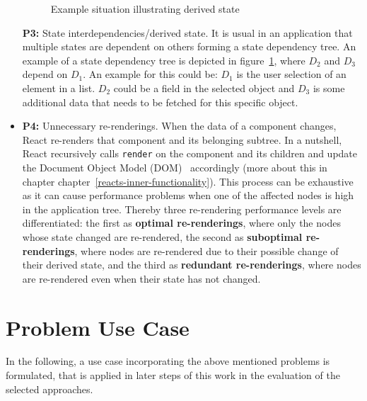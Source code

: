 \begin{itemize}
\begin{figure}[h!]
    \caption{Example situation illustrating derived state}
    \label{image_derived_state}
\end{figure}
  \textbf{P3:} State interdependencies/derived state. It is usual in an
  application that multiple states are dependent on others forming a
  state dependency tree. An example of a state dependency tree is depicted in figure~\ref{image_derived_state},
  where \(D_2\) and \(D_3\) depend on \(D_1\). An example for
  this could be: \(D_1\) is the user selection of an element in a list.
  \(D_2\) could be a field in the selected object and \(D_3\) is some
  additional data that needs to be fetched for this specific object.
\item
  \textbf{P4:} Unnecessary re-renderings. When the data of a component
  changes, React re-renders that component and its belonging subtree. In
  a nutshell, React recursively calls \texttt{render} on the
  component and its children and update the Document Object Model (DOM)~\cite{mozilla_dom}
  accordingly (more about this in chapter
  chapter~\ref{reacts-inner-functionality}). This process can be
  exhaustive as it can cause performance problems when one of the
  affected nodes is high in the application tree. Thereby three
  re-rendering performance levels are differentiated: the first as
  \textbf{optimal re-renderings}, where only the nodes whose state changed
  are re-rendered, the second as \textbf{suboptimal re-renderings}, where
  nodes are re-rendered due to their possible change of their derived
  state, and the third as \textbf{redundant re-renderings}, where nodes are
  re-rendered even when their state has not changed.
\end{itemize}

\hypertarget{problem-use-case}{%
\section{Problem Use Case}\label{problem-use-case}}

In the following, a use case incorporating the above mentioned problems
is formulated, that is applied in later steps of this work in the
evaluation of the selected approaches.

